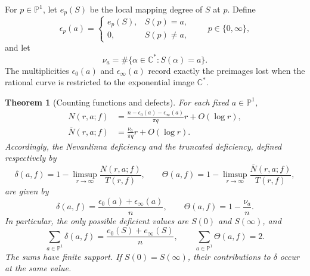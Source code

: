 \documentclass[11pt,reqno]{amsart}
\numberwithin{equation}{section}
\newtheorem{theorem}{Theorem}[section]
\theoremstyle{definition}
\theoremstyle{remark}
\newcommand{\C}{\mathbb C}
\newcommand{\PP}{\mathbb P}
\begin{document}
For $p\in\PP^1$, let $e_p(S)$ be the local mapping degree of
$S$ at $p$. Define
\begin{equation}
 \epsilon_p(a)=
 \begin{cases}
 e_p(S),&S(p)=a,\\
 0,&S(p)\ne a,
 \end{cases}
 \qquad p\in\{0,\infty\},
 \label{eq:endpoint-multiplicities}
\end{equation}
and let
\[
 \nu_a=\#\{\alpha\in\C^*:S(\alpha)=a\}.
\]
The multiplicities $\epsilon_0(a)$ and $\epsilon_\infty(a)$
record exactly the preimages lost when the rational curve is
restricted to the exponential image $\C^*$.

\begin{theorem}[Counting functions and defects]
\label{thm:defects}
For each fixed $a\in\PP^1$,
\begin{align}
 N(r,a;f)
 &=\frac{n-\epsilon_0(a)-\epsilon_\infty(a)}{\pi q}
       r+O(\log r),\label{eq:counting-asymptotic}\\
 \overline N(r,a;f)
 &=\frac{\nu_a}{\pi q}r+O(\log r).
 \label{eq:truncated-asymptotic}
\end{align}
Accordingly, the Nevanlinna deficiency and the truncated deficiency,
defined respectively by
\[
 \delta(a,f)=1-\limsup_{r\to\infty}\frac{N(r,a;f)}{T(r,f)},
 \qquad
 \Theta(a,f)=1-\limsup_{r\to\infty}
                 \frac{\overline N(r,a;f)}{T(r,f)},
\]
are given by
\begin{equation}
 \delta(a,f)=\frac{\epsilon_0(a)+\epsilon_\infty(a)}{n},
 \qquad \Theta(a,f)=1-\frac{\nu_a}{n}.
 \label{eq:defect-formulas}
\end{equation}
In particular, the only possible deficient values are $S(0)$ and
$S(\infty)$, and
\begin{equation}
 \sum_{a\in\PP^1}\delta(a,f)
   =\frac{e_0(S)+e_\infty(S)}{n},
 \qquad
 \sum_{a\in\PP^1}\Theta(a,f)=2.
 \label{eq:defect-sums}
\end{equation}
The sums have finite support. If $S(0)=S(\infty)$, their
contributions to $\delta$ occur at the same value.
\end{theorem}
\end{document}

